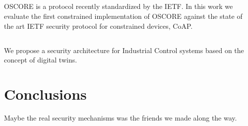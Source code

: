 \subsection{\paperIIItitle}
OSCORE is a protocol recently standardized by the IETF. In this work we evaluate the first constrained implementation of OSCORE against the state of the art IETF security protocol for constrained devices, CoAP. 
\subsection{\paperIVtitle}
We propose a security architecture for Industrial Control systems based on the concept of digital twins.

\section{Conclusions}
Maybe the real security mechanisms was the friends we made along the way.
\label{sec:kappa-conclusions}
{ \raggedright
\printbibliography[segment=\therefsegment,heading=bibintoc]
}
